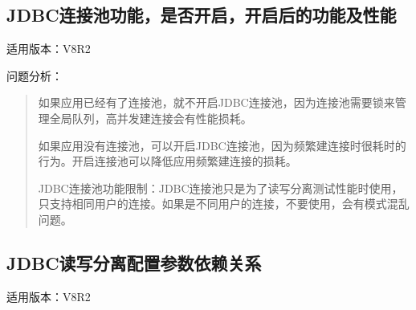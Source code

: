 \documentclass[letterpaper,10pt,english]{sphinxmanual}
\begin{document}
\subsection{JDBC连接池功能，是否开启，开启后的功能及性能}
\label{\detokenize{interface/jdbc:id6}}
适用版本：V8R2

问题分析：
\begin{quote}

如果应用已经有了连接池，就不开启JDBC连接池，因为连接池需要锁来管理全局队列，高并发建连接会有性能损耗。

如果应用没有连接池，可以开启JDBC连接池，因为频繁建连接时很耗时的行为。开启连接池可以降低应用频繁建连接的损耗。

JDBC连接池功能限制：JDBC连接池只是为了读写分离测试性能时使用，只支持相同用户的连接。如果是不同用户的连接，不要使用，会有模式混乱问题。
\end{quote}


\subsection{JDBC读写分离配置参数依赖关系}
\label{\detokenize{interface/jdbc:id7}}
适用版本：V8R2
\end{document}
